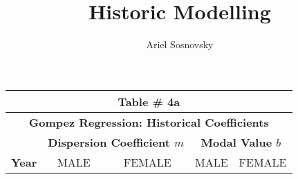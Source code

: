 \documentclass[10pt, titlepage]{article}%
\author{Ariel Sosnovsky}
\begin{document}
\title{Historic Modelling}
\maketitle

\clearpage

\begin{table}
  \begin{tabular}{||l|c|c|c|c||}
  \hline\hline
  \multicolumn{5}{||c||}{Table \# 4a } \\ \hline\hline
  \multicolumn{5}{||c||}{{\bf Gompez Regression: Historical Coefficients}} \\ \hline\hline
  
  { } & 
  \multicolumn{2}{|c|}{ \bf Dispersion Coefficient $m$ } & 
  \multicolumn{2}{|c|}{ \bf Modal Value $b$ }\\ \hline\hline
  
  {\bf Year } &
  {MALE} & {FEMALE} &
  {MALE} & {FEMALE} \\ \hline\hline


\end{tabular}
\end{table}
\end{document}
